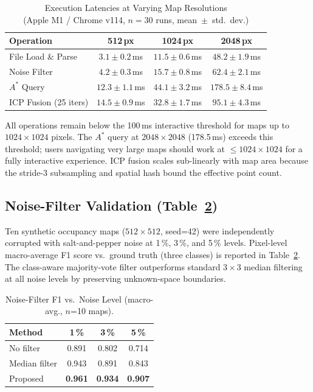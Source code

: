 \documentclass[journal]{IEEEtran}
\begin{document}
\begin{table}[t]
\centering
\caption{Execution Latencies at Varying Map Resolutions\\
(Apple M1 / Chrome v114, $n=30$ runs, mean~$\pm$~std.\ dev.)}
\label{tab:benchmarks}
\scriptsize
\renewcommand{\arraystretch}{1.1}
\begin{tabular}{@{}lccc@{}}
\toprule
\textbf{Operation} & \textbf{512\,px} & \textbf{1024\,px} & \textbf{2048\,px} \\
\midrule
File Load \& Parse & $3.1\pm0.2$\,ms & $11.5\pm0.6$\,ms & $48.2\pm1.9$\,ms \\
Noise Filter       & $4.2\pm0.3$\,ms & $15.7\pm0.8$\,ms & $62.4\pm2.1$\,ms \\
$A^{*}$ Query      & $12.3\pm1.1$\,ms & $44.1\pm3.2$\,ms & $178.5\pm8.4$\,ms \\
ICP Fusion (25 iters) & $14.5\pm0.9$\,ms & $32.8\pm1.7$\,ms & $95.1\pm4.3$\,ms \\
\bottomrule
\end{tabular}
\vspace{-2mm}
\end{table}

All operations remain below the 100\,ms interactive threshold for maps up to
$1024\times1024$ pixels.  The $A^{*}$ query at $2048\times2048$
(178.5\,ms) exceeds this threshold; users navigating very large maps should
work at $\leq1024\times1024$ for a fully interactive experience.  ICP fusion
scales sub-linearly with map area because the stride-3 subsampling and spatial
hash bound the effective point count.

\subsection{Noise-Filter Validation (Table~\ref{tab:noiseval})}

Ten synthetic occupancy maps ($512\times512$, seed=42) were independently
corrupted with salt-and-pepper noise at 1\,\%, 3\,\%, and 5\,\% levels.
Pixel-level macro-average F1 score vs.\ ground truth (three classes) is
reported in Table~\ref{tab:noiseval}.  The class-aware majority-vote filter
outperforms standard $3\times3$ median filtering at all noise levels by
preserving unknown-space boundaries.

\begin{table}[t]
\centering
\caption{Noise-Filter F1 vs.\ Noise Level (macro-avg., $n$=10 maps).}
\label{tab:noiseval}
\scriptsize
\renewcommand{\arraystretch}{1.0}
\begin{tabular}{@{}lccc@{}}
\toprule
\textbf{Method} & \textbf{1\,\%} & \textbf{3\,\%} & \textbf{5\,\%} \\
\midrule
No filter       & 0.891 & 0.802 & 0.714 \\
Median filter   & 0.943 & 0.891 & 0.843 \\
Proposed        & \textbf{0.961} & \textbf{0.934} & \textbf{0.907} \\
\bottomrule
\end{tabular}
\vspace{-2mm}
\end{table}
\end{document}
